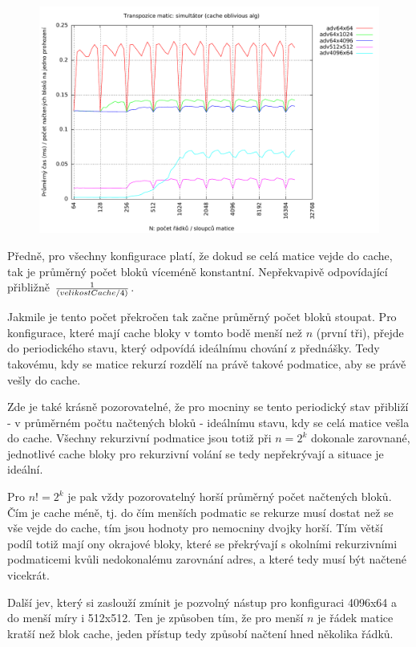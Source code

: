 \documentclass[12pt,a4paper]{report}
\begin{document}
	\begin{figure}[h]	
		\centering	
		\includegraphics[scale=0.6]{graph_2_adv}		
	\end{figure}
	
	Předně, pro všechny konfigurace platí, že dokud se celá matice vejde do cache, tak je průměrný počet bloků víceméně konstantní. Nepřekvapivě odpovídající přibližně $1\over(velikostCache/4)$. 
	
	Jakmile je tento počet překročen tak začne průměrný počet bloků stoupat. Pro konfigurace, které mají cache bloky v tomto bodě menší než $n$ (první tři), přejde do periodického  stavu, který odpovídá ideálnímu chování z přednášky. Tedy takovému, kdy se matice rekurzí rozdělí na právě takové podmatice, aby se právě vešly do cache. 
	
	Zde je také krásně pozorovatelné, že pro mocniny se tento periodický stav přibliží - v průměrném počtu načtených bloků - ideálnímu stavu, kdy se celá matice vešla do cache. Všechny rekurzivní podmatice jsou totiž při $n = 2^k$ dokonale zarovnané, jednotlivé cache bloky pro rekurzivní volání se tedy nepřekrývají a situace je ideální.
	
	Pro $n != 2^k$ je pak vždy pozorovatelný horší průměrný počet načtených bloků. Čím je cache méně, tj. do čím menších podmatic se rekurze musí dostat než se vše vejde do cache, tím jsou hodnoty pro nemocniny dvojky horší. Tím větší podíl totiž mají ony okrajové bloky, které se překrývají s okolními rekurzivními podmaticemi kvůli nedokonalému zarovnání adres, a které tedy musí být načtené vicekrát.
	
	Další jev, který si zaslouží zmínit je pozvolný nástup pro konfiguraci 4096x64 a do menší míry i 512x512. Ten je způsoben tím, že pro menší $n$ je řádek matice kratší než blok cache, jeden přístup tedy způsobí načtení hned několika řádků.
	
\end{document}
